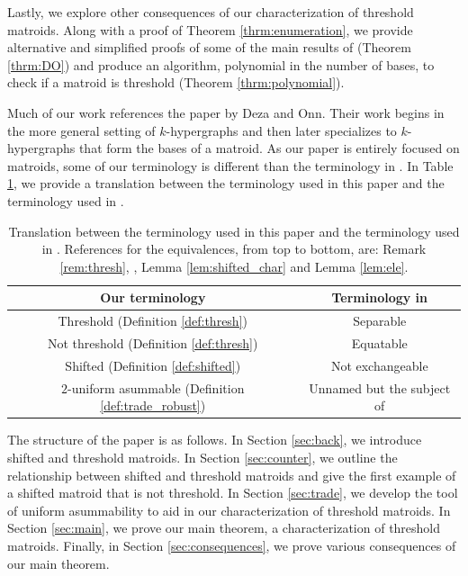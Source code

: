 \documentclass{amsart}
\theoremstyle{definition}
\theoremstyle{plain}
\begin{document}
Lastly, we explore other consequences of our characterization of threshold matroids. Along with a proof of Theorem \ref{thrm:enumeration}, we provide alternative and simplified proofs of some of the main results of \cite{DO} (Theorem \ref{thrm:DO}) and produce an algorithm, polynomial in the number of bases, to check if a matroid is threshold (Theorem \ref{thrm:polynomial}).

Much of our work references the paper \cite{DO} by Deza and Onn. Their work begins in the more general setting of $k$-hypergraphs and then later specializes to $k$-hypergraphs that form the bases of a matroid. As our paper is entirely focused on matroids, some of our terminology is different than the terminology in \cite{DO}. In Table \ref{tab:table}, we provide a translation between the terminology used in this paper and the terminology used in \cite{DO}.

\begin{table}[ht] 
\label{tab:table}
\centering
    \begin{tabular}{cc}\toprule
         Our terminology & Terminology in \cite{DO} \\ 
         \midrule
         Threshold (Definition \ref{def:thresh}) & Separable \cite[Section $1$]{DO}\\[1em]
         Not threshold (Definition \ref{def:thresh}) & Equatable \cite[Section $1$]{DO}\\[1em]
         Shifted (Definition \ref{def:shifted}) & Not exchangeable \cite[Section $1$]{DO}\\[1em]
         $2$-uniform asummable (Definition \ref{def:trade_robust}) & Unnamed but the subject of \cite[Question $1.1$]{DO}\\[1em]
    \end{tabular}
    \caption{Translation between the terminology used in this paper and the terminology used in \cite{DO}. References for the equivalences, from top to bottom, are: Remark \ref{rem:thresh}, \cite[Lemma $2.1$]{DO}, Lemma \ref{lem:shifted_char} and Lemma \ref{lem:ele}.}
\end{table}



The structure of the paper is as follows. In Section \ref{sec:back}, we introduce shifted and threshold matroids. In Section \ref{sec:counter}, we outline the relationship between shifted and threshold matroids and give the first example of a shifted matroid that is not threshold. In Section \ref{sec:trade}, we develop the tool of uniform asummability to aid in our characterization of threshold matroids. In Section \ref{sec:main}, we prove our main theorem, a characterization of threshold matroids. Finally, in Section \ref{sec:consequences}, we prove various consequences of our main theorem.
\end{document}
